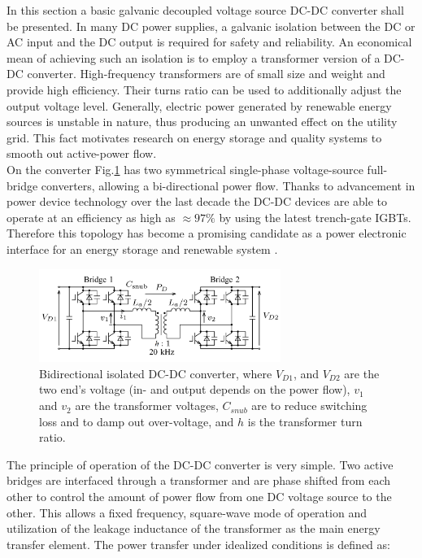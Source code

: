 In this section a basic galvanic decoupled voltage source DC-DC converter shall be presented. In many DC power supplies, a galvanic isolation between the DC or AC input and the DC output is required for safety and reliability. An economical mean of achieving such an isolation is to employ a transformer version of a DC-DC converter. High-frequency transformers are of small size and weight and provide high efficiency. Their turns ratio can be used to additionally adjust the output voltage level. Generally, electric power generated by renewable energy sources is unstable in nature, thus producing an unwanted effect on the utility grid. This fact motivates research on energy storage and quality systems to smooth out active-power flow.\\
On the converter Fig.\ref{BASICCSR:fig:DCDCGalvanic} has two symmetrical single-phase voltage-source full-bridge converters, allowing a bi-directional power flow. Thanks to advancement in power device technology over the last decade the DC-DC devices are able to operate at an efficiency as high as $\approx97\%$ by using the latest trench-gate IGBTs. Therefore this topology has become a promising candidate as a power electronic interface for an energy storage and renewable system \cite{kheraluwala1992performance} \cite{inoue2007bidirectional}.


\begin{figure}[!ht]
        \centering
        \includegraphics[width=0.7\textwidth]{EMPC_PNG_Pics/DC_DC_galvanic.png}
        \caption{Bidirectional isolated DC-DC converter, where $V_{D1}$, and $V_{D2}$ are the two end's voltage (in- and output depends on the power flow), $v_1$ and $v_2$ are the transformer voltages, $C_{snub}$ are to reduce switching loss and to damp out
over-voltage, and $h$ is the transformer turn ratio.}
        \label{BASICCSR:fig:DCDCGalvanic}
    \end{figure}
		
The principle of operation of the DC-DC converter is very simple. Two active bridges are interfaced through a transformer and are phase shifted from each other to control the amount of power flow from one DC voltage source to the other. This allows a fixed frequency, square-wave mode of operation and utilization of the leakage inductance of the transformer as the main energy transfer element. The power transfer under idealized conditions is defined as:

